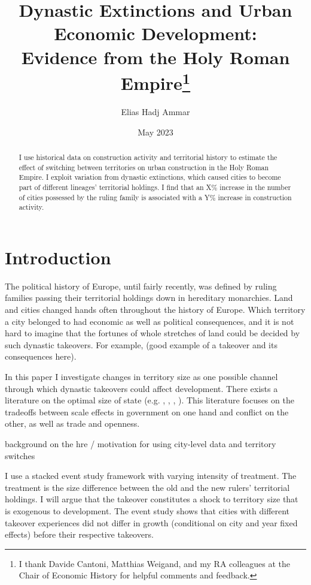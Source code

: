 \documentclass{article}
\title{Dynastic Extinctions and Urban Economic Development: \\Evidence from the Holy Roman Empire\footnote{I thank Davide Cantoni, Matthias Weigand, and my RA colleagues at the Chair of Economic History for helpful comments and feedback.}
}
\author{Elias Hadj Ammar}
\date{May 2023}
\begin{document}
\onehalfspacing
\maketitle
\thispagestyle{empty}

\begin{abstract}
I use historical data on construction activity and territorial history to estimate the effect of switching between territories on urban construction in the Holy Roman Empire. I exploit variation from dynastic extinctions, which caused cities to become part of different lineages' territorial holdings. I find that an X\% increase in the number of cities possessed by the ruling family is associated with a Y\% increase in construction activity.
\end{abstract}




\newpage

\setcounter{page}{1}
\doublespacing

 
\section{Introduction}

The political history of Europe, until fairly recently, was defined by ruling families passing their territorial holdings down in hereditary monarchies. Land and cities changed hands often throughout the history of Europe. Which territory a city belonged to had economic as well as political consequences, and it is not hard to imagine that the fortunes of whole stretches of land could be decided by such dynastic takeovers. For example, (good example of a takeover and its consequences here).

In this paper I investigate changes in territory size as one possible channel through which dynastic takeovers could affect development. There exists a literature on the optimal size of state (e.g. \cite{as1997}, \cite{aw1998}, \cite{asw2000}, \cite{easterly2000}). This literature focuses on the tradeoffs between scale effects in government on one hand and conflict on the other, as well as trade and openness.

background on the hre / motivation for using city-level data and territory switches

I use a stacked event study framework with varying intensity of treatment. The treatment is the size difference between the old and the new rulers' territorial holdings. I will argue that the takeover constitutes a shock to territory size that is exogenous to development. The event study shows that cities with different takeover experiences did not differ in growth (conditional on city and year fixed effects) before their respective takeovers. 
\end{document}
